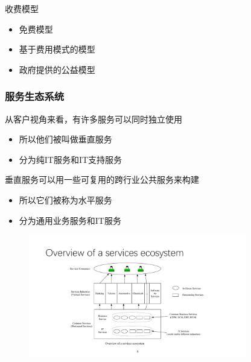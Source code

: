 收费模型
\vspace{-0.8em}
\begin{multicols}{3}
    \begin{itemize}
        \item 免费模型
        \item 基于费用模式的模型
        \item 政府提供的公益模型
    \end{itemize}
\end{multicols}
\vspace{-1em}

\subsubsection{服务生态系统}
从客户视角来看，有许多服务可以同时独立使用
\vspace{-0.8em}
\begin{multicols}{2}
    \begin{itemize}
        \item 所以他们被叫做垂直服务
        \item 分为纯IT服务和IT支持服务
    \end{itemize}    
\end{multicols}
\vspace{-1em}

垂直服务可以用一些可复用的跨行业公共服务来构建
\vspace{-0.8em}
\begin{multicols}{2}
    \begin{itemize}
        \item 所以它们被称为水平服务
        \item 分为通用业务服务和IT服务
    \end{itemize}    
\end{multicols}
\vspace{-1em}

\begin{figure}[H]
    \vspace{-0.5em}
	\centering
	\includegraphics[width=0.85\textwidth]{images/Overview of a services ecosystem.pdf}
    \vspace{-1em}
\end{figure}


